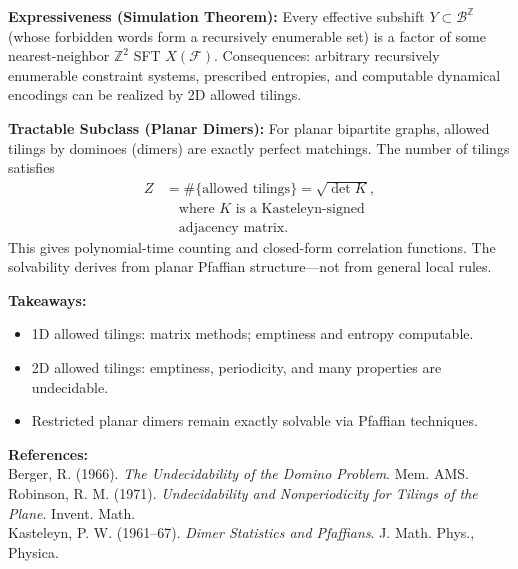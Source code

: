 \begin{technical}
\noindent\textbf{Expressiveness (Simulation Theorem):}  
Every effective subshift $Y\subset\mathcal{B}^{\mathbb{Z}}$ (whose forbidden words form a recursively enumerable set) is a factor of some nearest-neighbor $\mathbb{Z}^2$ SFT $X(\mathcal{F})$.  
Consequences: arbitrary recursively enumerable constraint systems, prescribed entropies, and computable dynamical encodings can be realized by 2D allowed tilings.

\noindent\textbf{Tractable Subclass (Planar Dimers):}  
For planar bipartite graphs, allowed tilings by dominoes (dimers) are exactly perfect matchings. The number of tilings satisfies
\begin{align*}
Z &= \#\{\text{allowed tilings}\} = \sqrt{\det K}, \\
    &\quad \text{where } K \text{ is a Kasteleyn-signed}\\
    &\quad \text{adjacency matrix.}
\end{align*}
This gives polynomial-time counting and closed-form correlation functions.  
The solvability derives from planar Pfaffian structure—not from general local rules.

\vspace{0.5em}
\noindent\textbf{Takeaways:}
\begin{itemize}\itemsep0.2em
\item 1D allowed tilings: matrix methods; emptiness and entropy computable.
\item 2D allowed tilings: emptiness, periodicity, and many properties are undecidable.
\item Restricted planar dimers remain exactly solvable via Pfaffian techniques.
\end{itemize}

\vspace{0.5em}
\noindent\textbf{References:}\\
{\footnotesize
Berger, R. (1966). \textit{The Undecidability of the Domino Problem}. Mem. AMS.\\
Robinson, R. M. (1971). \textit{Undecidability and Nonperiodicity for Tilings of the Plane}. Invent. Math.\\
Kasteleyn, P. W. (1961–67). \textit{Dimer Statistics and Pfaffians}. J. Math. Phys., Physica.
}
\end{technical}
